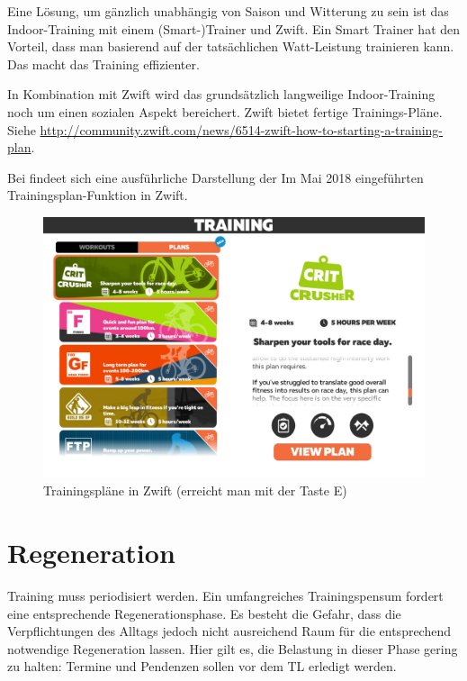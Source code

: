 \documentclass[a4paper,DIV13,BCOR0cm,draft=TRUE]{scrartcl}
\begin{document}
Eine Lösung, um gänzlich unabhängig von Saison und Witterung zu sein ist das Indoor-Training mit einem (Smart-)Trainer und Zwift.
Ein Smart Trainer hat den Vorteil, dass man basierend auf der tatsächlichen Watt-Leistung trainieren kann.
Das macht das Training effizienter.

In Kombination mit Zwift wird das grundsätzlich langweilige Indoor-Training noch um einen sozialen Aspekt bereichert.
Zwift bietet fertige Trainings-Pläne. Siehe \url{http://community.zwift.com/news/6514-zwift-how-to-starting-a-training-plan}.

Bei  findeet sich eine ausführliche Darstellung der
Im Mai 2018 eingeführten Trainingsplan-Funktion in Zwift.


\begin{figure}[htb]
  \centering
  \includegraphics[width=1\textwidth]{figs/zwifttrainingplans.jpg}

  \caption{Trainingspläne in Zwift (erreicht man mit der Taste E)}
  \label{fig:zwifttrainingplans}

\end{figure}

\section{Regeneration}
\label{sec:regeneration}

Training muss periodisiert werden. Ein umfangreiches Trainingspensum fordert eine entsprechende Regenerationsphase.
Es besteht die Gefahr, dass die Verpflichtungen des Alltags jedoch nicht ausreichend Raum für die entsprechend notwendige Regeneration lassen.
Hier gilt es, die Belastung in dieser Phase gering zu halten: Termine und Pendenzen sollen vor dem TL erledigt werden.
\end{document}
